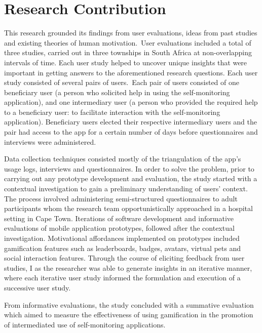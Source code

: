 \section{Research Contribution}
This research grounded its findings from user evaluations, ideas from past studies and  existing theories of human motivation.~User evaluations included a total of three studies, carried out in three townships in South Africa at non-overlapping intervals of time. Each user study helped to uncover unique insights that were important in getting answers to the aforementioned research questions. Each user study consisted of several pairs of users.~Each pair of users consisted of one beneficiary user (a person who solicited help in using the self-monitoring application), and one intermediary user (a person who provided the required help to a beneficiary user: to facilitate interaction with the self-monitoring application). Beneficiary users elected their respective intermediary users and the pair had access to the app for a certain number of days before questionnaires and interviews were administered.  

Data collection techniques consisted mostly of the triangulation of the app's usage logs, interviews and questionnaires. In order to solve the problem, prior to carrying out any prototype development and evaluation, the study started with a contextual investigation to gain a preliminary understanding of users' context. The process involved administering semi-structured questionnaires to adult participants whom the research team opportunistically approached in a hospital setting in Cape Town. Iterations of software development and informative evaluations of mobile application prototypes, followed after the contextual investigation. Motivational affordances implemented on prototypes included gamification features such as leaderboards, badges, avatars, virtual pets and social interaction features.  Through the course of eliciting feedback from user studies, I as the researcher was able to generate insights in an iterative manner, where each iterative user study informed the formulation and execution of a successive user study. 

From informative evaluations, the study concluded with a summative evaluation which aimed to measure the effectiveness of using gamification in the promotion of intermediated use of self-monitoring applications. 
 
